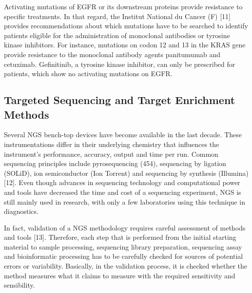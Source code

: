 Activating mutations of EGFR or its downstream proteins provide resistance to specific treatments. In that regard, the Institut National du Cancer (F) [11] provides recommendations about which mutations have to be searched to identify patients eligible for the administration of monoclonal antibodies or tyrosine kinase inhibitors. For instance, mutations on codon 12 and 13 in the KRAS gene provide resistance to the monoclonal antibody agents panitumumab and cetuximab. Gefinitinib, a tyrosine kinase inhibitor, can only be prescribed for patients, which show no activating mutations on EGFR.

\subsection{Targeted Sequencing and Target Enrichment Methods}

Several NGS bench-top devices have become available in the last decade. These instrumentations differ in their underlying chemistry that influences the instrument’s performance, accuracy, output and time per run. Common sequencing principles include pyrosequencing (454), sequencing by ligation (SOLiD), ion semiconductor (Ion Torrent) and sequencing by synthesis (Illumina) [12]. Even though advances in sequencing technology and computational power and tools have decreased the time and cost of a sequencing experiment, NGS is still mainly used in research, with only a few laboratories using this technique in diagnostics.

In fact, validation of a NGS methodology requires careful assessment of methods and tools [13]. Therefore, each step that is performed from the initial starting material to sample processing, sequencing library preparation, sequencing assay and bioinformatic processing has to be carefully checked for sources of potential errors or variability. Basically, in the validation process, it is checked whether the method measures what it claims to measure with the required sensitivity and sensibility.

